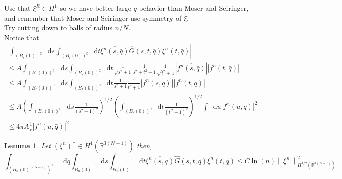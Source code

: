 \documentclass[a4paper,11pt]{article}
\newcommand{\norm}[1]{\left\lVert #1 \right\rVert}
\newcommand{\abs}[1]{\left\lvert #1 \right\rvert}
\newcommand*\diff{\mathop{}\!\mathrm{d}}
\newcommand{\R}{\mathbb{R}}
\newtheorem{lemma}{Lemma}
\numberwithin{equation}{section}
\begin{document}
	Use that $ \xi^R\in H^1 $ so we have better large $ q $ behavior than Moser and Seiringer, and remember that Moser and Seiringer use symmetry of $ \xi $.\\ Try cutting down to balls of radius $ n/N $.\\
	Notice that\begin{equation}
	\begin{aligned}
	\abs{\int_{(B_r(0))^\complement}\diff s\int_{(B_r(0))^\complement}\diff t \overline{\xi^n(s,\bar{q})}\hat{G}(s,t,\bar{q})\xi^n(t,\bar{q})}\\\leq A \int_{(B_r(0))^\complement}\diff s\int_{(B_r(0))^\complement}\diff t \frac{1}{\sqrt{s^2+1}}\frac{1}{s^2+t^2+1}\frac{1}{\sqrt{t^2+1}} \abs{\overline{f^n(s,\bar{q})}}\abs{f^n(t,\bar{q})}\\
	\leq A \int_{(B_r(0))^\complement}\diff s\int_{(B_r(0))^\complement}\diff t \frac{1}{s^2+1}\frac{1}{t^2+1} \abs{f^n(s,\bar{q})}\abs{f^n(t,\bar{q})}\\
	\leq A \left(\int_{(B_r(0))^\complement}\diff s \frac{1}{(s^2+1)^2}\right)^{1/2}\left(\int_{(B_r(0))^\complement}\diff t \frac{1}{(t^2+1)^2} \right)^{1/2}\int \diff u \abs{f^n(u,\bar{q})}^2\\
	\leq 4\pi A \frac{1}{r}\abs{f^n(u,\bar{q})}^2
	\end{aligned}
	\end{equation}
	\begin{lemma}
		Let $ (\xi^n)^\vee\in H^1(\R^{3(N-1)}) $ then, \begin{equation}
		\int_{(B_{n}(0)^{3(N-2)})^\complement}\diff \bar{q}\int_{ B_n(0)}\diff s\int_{ B_n(0)}\diff t \overline{\xi^n(s,\bar{q})}\hat{G}(s,t,\bar{q})\xi^n(t,\bar{q})\leq C\ln(n)\norm{\xi^n}^2_{H^{1/2}(\R^{3(N-1)})}.
		\end{equation}
	\end{lemma}
\end{document}
